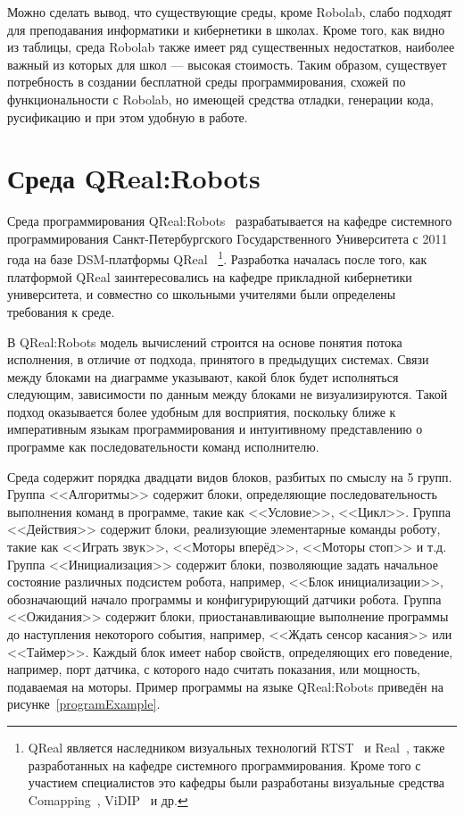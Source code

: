 \documentclass[a4paper]{article}
\begin{document}
Можно сделать вывод, что существующие среды, кроме Robolab, слабо подходят для преподавания информатики и кибернетики в школах. Кроме того, как видно из таблицы, среда Robolab также имеет ряд существенных недостатков, наиболее важный из которых для школ --- высокая стоимость. Таким образом, существует потребность в создании бесплатной среды программирования, схожей по функциональности с Robolab, но имеющей средства отладки, генерации кода, русификацию и при этом удобную в работе.

\section{Среда QReal:Robots}
Среда программирования QReal:Robots~\cite{robots} разрабатывается на кафедре системного программирования Санкт-Петербургского Государственного Университета с 2011 года на базе DSM-платформы QReal~\cite{qReal} {\footnote {QReal является наследником визуальных технологий RTST~\cite{rtst} и Real~\cite{real}, также разработанных на кафедре системного программирования. Кроме того с участием специалистов это кафедры были разработаны визуальные средства Comapping~\cite{comapping}, ViDIP~\cite{viDip} и др.}}. Разработка началась после того, как платформой QReal заинтересовались на кафедре прикладной кибернетики университета, и совместно со школьными учителями были определены требования к среде.

В QReal:Robots модель вычислений строится на основе понятия потока исполнения, в отличие от подхода, принятого в предыдущих системах. Связи между блоками на диаграмме указывают, какой блок будет исполняться следующим, зависимости по данным между блоками не визуализируются. Такой подход оказывается более удобным для восприятия, поскольку ближе к императивным языкам программирования и интуитивному представлению о программе как последовательности команд исполнителю. 

Среда содержит порядка двадцати видов блоков, разбитых по смыслу на 5 групп. Группа <<Алгоритмы>> содержит блоки, определяющие последовательность выполнения команд в программе, такие как <<Условие>>, <<Цикл>>. Группа <<Действия>> содержит блоки, реализующие элементарные команды роботу, такие как <<Играть звук>>, <<Моторы вперёд>>, <<Моторы стоп>> и т.д. Группа <<Инициализация>> содержит блоки, позволяющие задать начальное состояние различных подсистем робота, например, <<Блок инициализации>>, обозначающий начало программы и конфигурирующий датчики робота. Группа <<Ожидания>> содержит блоки, приостанавливающие выполнение программы до наступления некоторого события, например, <<Ждать сенсор касания>> или <<Таймер>>. Каждый блок имеет набор свойств, определяющих его поведение, например, порт датчика, с которого надо считать показания, или мощность, подаваемая на моторы. Пример программы на языке QReal:Robots приведён на рисунке~\ref{programExample}.
\end{document}

